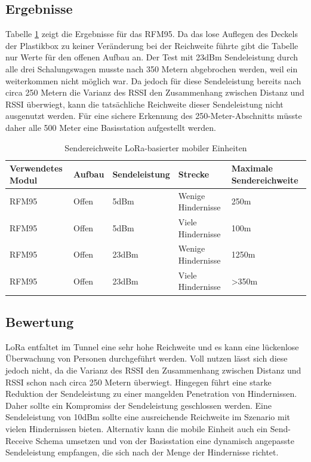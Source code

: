 \subsection{Ergebnisse}
Tabelle \ref{table:rangelora} zeigt die Ergebnisse für das RFM95.
Da das lose Auflegen des Deckels der Plastikbox zu keiner Veränderung bei der Reichweite führte gibt die Tabelle nur Werte für den offenen Aufbau an. 
Der Test mit 23dBm Sendeleistung durch alle drei Schalungswagen musste nach 350 Metern abgebrochen werden, weil ein weiterkommen nicht möglich war.
Da jedoch für diese Sendeleistung bereits nach circa 250 Metern die Varianz des RSSI den Zusammenhang zwischen Distanz und RSSI überwiegt, kann die tatsächliche Reichweite dieser Sendeleistung nicht ausgenutzt werden.
Für eine sichere Erkennung des 250-Meter-Abschnitts müsste daher alle 500 Meter eine Basisstation aufgestellt werden.

\begin{table}[h]
	\centering
	\caption{Sendereichweite LoRa-basierter mobiler Einheiten}
	\label{table:rangelora}
	\begin{tabular}{p{2.2cm}|p{1.5cm}|p{2.5cm}|p{3.5cm}|p{3cm}}
		Verwendetes Modul & Aufbau & Sendeleistung & Strecke & Maximale Sendereichweite \\
		\hline
		RFM95 & Offen & 5dBm & Wenige Hindernisse & 250m \\
		RFM95 & Offen & 5dBm & Viele Hindernisse & 100m \\
		\hline
		RFM95 & Offen & 23dBm & Wenige Hindernisse & 1250m \\
		RFM95 & Offen & 23dBm & Viele Hindernisse & >350m \\
	\end{tabular}
\end{table}

\subsection{Bewertung}
LoRa entfaltet im Tunnel eine sehr hohe Reichweite und es kann eine lückenlose Überwachung von Personen durchgeführt werden.
Voll nutzen lässt sich diese jedoch nicht, da die Varianz des RSSI den Zusammenhang zwischen Distanz und RSSI schon nach circa 250 Metern überwiegt. 
Hingegen führt eine starke Reduktion der Sendeleistung zu einer mangelden Penetration von Hindernissen.
Daher sollte ein Kompromiss der Sendeleistung geschlossen werden. 
Eine Sendeleistung von 10dBm sollte eine ausreichende Reichweite im Szenario mit vielen Hindernissen bieten.
Alternativ kann die mobile Einheit auch ein Send-Receive Schema umsetzen und von der Basisstation eine dynamisch angepasste Sendeleistung empfangen, die sich nach der Menge der Hindernisse richtet.

